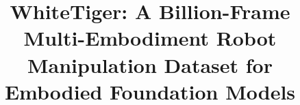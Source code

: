 \documentclass[10pt,twocolumn,letterpaper]{article}
\title{WhiteTiger: A Billion-Frame Multi-Embodiment Robot Manipulation Dataset for Embodied Foundation Models}
\author{}
\date{}
\begin{document}
\maketitle







{\small


}
\end{document}
